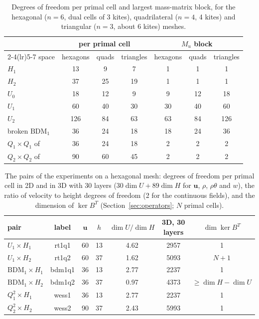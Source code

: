 \documentclass[preprint,12pt]{elsarticle}
\newcommand{\bu}{\mathbf{u}}
\theoremstyle{definition}
\begin{document}
\begin{table}[t]
\centering
\caption{Degrees of freedom per primal cell and largest mass-matrix block, for the hexagonal ($n = 6$, dual
cells of 3 kites), quadrilateral ($n = 4$, 4 kites) and triangular ($n = 3$, about 6 kites) meshes.}
\label{tab:dofs}
\small\begin{tabular}{lcccccc}
\toprule
& \multicolumn{3}{c}{per primal cell} & \multicolumn{3}{c}{$M_u$ block} \\
\cmidrule(lr){2-4}\cmidrule(lr){5-7}
space & hexagons & quads & triangles & hexagons & quads & triangles \\
\midrule
$H_1$          & 13 & 9  & 7  & 1 & 1 & 1 \\
$H_2$          & 37 & 25 & 19 & 1 & 1 & 1 \\
$U_0$          & 18 & 12 & 9  & 9 & 12 & 18 \\
$U_1$          & 60 & 40 & 30 & 30 & 40 & 60 \\
$U_2$          & 126 & 84 & 63 & 63 & 84 & 126 \\
broken $\mathrm{BDM}_1$ & 36 & 24 & 18 & 18 & 24 & 36 \\
$Q_1\times Q_1$ of \cite{Wess2024} & 36 & 24 & 18 & 2 & 2 & 2 \\
$Q_2\times Q_2$ of \cite{Wess2024} & 90 & 60 & 45 & 2 & 2 & 2 \\
\bottomrule
\end{tabular}
\end{table}

\begin{table}[t]
\centering
\caption{The pairs of the experiments on a hexagonal mesh: degrees of freedom per primal cell in 2D and in
3D with 30 layers ($30\dim U + 89\dim H$ for $\bu$, $\rho$, $\rho\theta$ and $w$), the ratio of velocity to
height degrees of freedom (2 for the continuous fields), and the dimension of $\ker B^T$
(Section~\ref{sec:operators}; $N$ primal cells).}
\label{tab:pairs}
\footnotesize\setlength{\tabcolsep}{4pt}\begin{tabular}{lcccccc}
\toprule
pair & label & $\bu$ & $h$ & $\dim U/\dim H$ & 3D, 30 layers & $\dim\ker B^T$ \\
\midrule
$U_1\times H_1$ & rt1q1 & 60 & 13 & 4.62 & 2957 & 1 \\
$U_1\times H_2$ & rt1q2 & 60 & 37 & 1.62 & 5093 & $N + 1$ \\
$\mathrm{BDM}_1\times H_1$ & bdm1q1 & 36 & 13 & 2.77 & 2237 & 1 \\
$\mathrm{BDM}_1\times H_2$ & bdm1q2 & 36 & 37 & 0.97 & 4373 & $\ge\dim H - \dim U$ \\
$Q_1^2\times H_1$ \cite{Wess2024} & wess1 & 36 & 13 & 2.77 & 2237 & 1 \\
$Q_2^2\times H_2$ \cite{Wess2024} & wess2 & 90 & 37 & 2.43 & 5993 & 1 \\
\bottomrule
\end{tabular}
\end{table}
\end{document}
